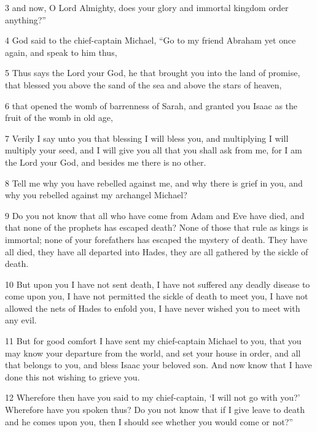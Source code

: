 \par 3 and now, O Lord Almighty, does your glory and immortal kingdom order anything?” 

\par 4 God said to the chief-captain Michael, “Go to my friend Abraham yet once again, and speak to him thus, 

\par 5 Thus says the Lord your God, he that brought you into the land of promise, that blessed you above the sand of the sea and above the stars of heaven, 

\par 6 that opened the womb of barrenness of Sarah, and granted you Isaac as the fruit of the womb in old age, 

\par 7 Verily I say unto you that blessing I will bless you, and multiplying I will multiply your seed, and I will give you all that you shall ask from me, for I am the Lord your God, and besides me there is no other. 

\par 8 Tell me why you have rebelled against me, and why there is grief in you, and why you rebelled against my archangel Michael? 

\par 9 Do you not know that all who have come from Adam and Eve have died, and that none of the prophets has escaped death? None of those that rule as kings is immortal; none of your forefathers has escaped the mystery of death. They have all died, they have all departed into Hades, they are all gathered by the sickle of death. 

\par 10 But upon you I have not sent death, I have not suffered any deadly disease to come upon you, I have not permitted the sickle of death to meet you, I have not allowed the nets of Hades to enfold you, I have never wished you to meet with any evil. 

\par 11 But for good comfort I have sent my chief-captain Michael to you, that you may know your departure from the world, and set your house in order, and all that belongs to you, and bless Isaac your beloved son. And now know that I have done this not wishing to grieve you. 

\par 12 Wherefore then have you said to my chief-captain, ‘I will not go with you?’ Wherefore have you spoken thus? Do you not know that if I give leave to death and he comes upon you, then I should see whether you would come or not?”

